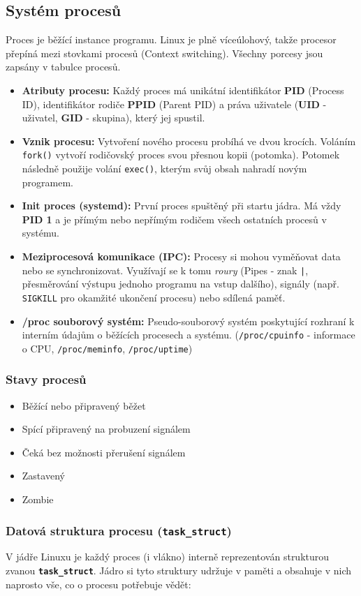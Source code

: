 \subsection{Systém procesů}
Proces je běžící instance programu. Linux je plně víceúlohový, takže procesor přepíná mezi stovkami procesů (Context switching).
Všechny porcesy jsou zapsány v tabulce procesů.
\begin{itemize}
    \item \textbf{Atributy procesu:} Každý proces má unikátní identifikátor \textbf{PID} (Process ID), identifikátor rodiče \textbf{PPID} (Parent PID) a práva uživatele (\textbf{UID} - uživatel, \textbf{GID} - skupina), který jej spustil.
    \item \textbf{Vznik procesu:} Vytvoření nového procesu probíhá ve dvou krocích. Voláním \texttt{fork()} vytvoří rodičovský proces svou přesnou kopii (potomka). Potomek následně použije volání \texttt{exec()}, kterým svůj obsah nahradí novým programem.
    \item \textbf{Init proces (systemd):} První proces spuštěný při startu jádra. Má vždy \textbf{PID 1} a je přímým nebo nepřímým rodičem všech ostatních procesů v systému.
    \item \textbf{Meziprocesová komunikace (IPC):} Procesy si mohou vyměňovat data nebo se synchronizovat. Využívají se k tomu \textit{roury} (Pipes - znak \texttt{|}, přesměrování výstupu jednoho programu na vstup dalšího), signály (např. \texttt{SIGKILL} pro okamžité ukončení procesu) nebo sdílená paměť.
    \item \textbf{/proc souborový systém:} Pseudo-souborový systém poskytující rozhraní k interním údajům o běžících procesech a systému. (\texttt{/proc/cpuinfo} - informace o CPU, \texttt{/proc/meminfo}, \texttt{/proc/uptime})
\end{itemize}
\subsubsection*{Stavy procesů}
\label{prg:stavy}
\begin{itemize}
    \item Běžící nebo připravený běžet
    \item Spící připravený na probuzení signálem
    \item Čeká bez možnosti přerušení signálem
    \item Zastavený
    \item Zombie
\end{itemize}
\subsubsection*{Datová struktura procesu (\texttt{task\_struct})}
\label{prg:taskstruct}
V jádře Linuxu je každý proces (i vlákno) interně reprezentován  strukturou zvanou \textbf{\texttt{task\_struct}}. Jádro si tyto struktury udržuje v paměti a obsahuje v nich naprosto vše, co o procesu potřebuje vědět:

